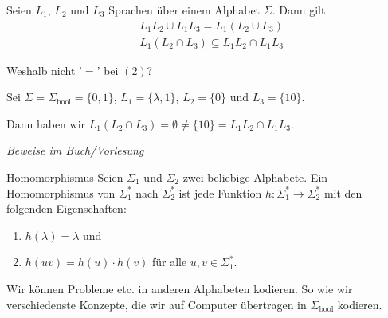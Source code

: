 

	\begin{subbox}{}
		Seien $L_1$, $L_2$ und $L_3$ Sprachen über einem Alphabet $\Sigma$. Dann gilt
		\begin{align}
			&L_1L_2 \cup L_1L_3 = L_1(L_2 \cup L_3) \\
			&L_1(L_2 \cap L_3) \subseteq L_1L_2 \cap L_1L_3
		\end{align}
	\end{subbox}
	Weshalb nicht '$=$' bei $(2)$?

	Sei $\Sigma = \Sigma_{\text{bool}} = \{0,1\}$, $L_1 = \{\lambda, 1\}$, $L_2 = \{0\}$ und $L_3 = \{10\}$.

	Dann haben wir $L_1(L_2 \cap L_3) = \emptyset \neq \{10\} = L_1L_2 \cap L_1L_3$.

	\textit{Beweise im Buch/Vorlesung}



	\begin{mainbox}{Homomorphismus}
		Seien $\Sigma_1$ und $\Sigma_2$ zwei beliebige Alphabete. Ein Homomorphismus von $\Sigma_1^*$ nach $\Sigma_2^*$ ist jede Funktion $h: \Sigma_1^* \to \Sigma_2^*$ mit den folgenden Eigenschaften:
		\begin{enumerate}[label=(\roman*)]
			\item $h(\lambda) = \lambda$ und 
			\item $h(uv) = h(u)\cdot h(v)$ für alle $u, v \in \Sigma_1^*$.
		\end{enumerate}
	\end{mainbox}
	Wir können Probleme etc. in anderen Alphabeten kodieren. So wie wir verschiedenste Konzepte, die wir auf Computer übertragen in $\Sigma_{\text{bool}}$ kodieren.

